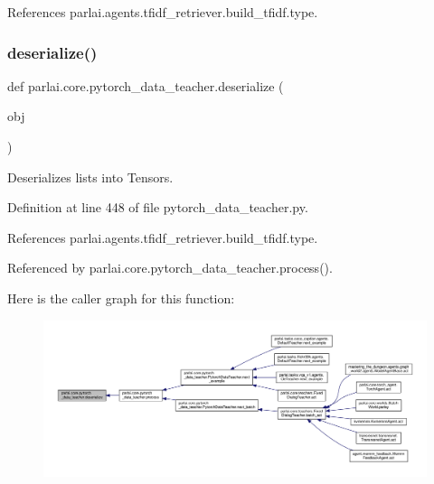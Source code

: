 References parlai.\+agents.\+tfidf\+\_\+retriever.\+build\+\_\+tfidf.\+type.

\mbox{\label{namespaceparlai_1_1core_1_1pytorch__data__teacher_a0c6f08553514c14d037da194f9d112ae}} 
\subsubsection{\texorpdfstring{deserialize()}{deserialize()}}
{\footnotesize\ttfamily def parlai.\+core.\+pytorch\+\_\+data\+\_\+teacher.\+deserialize (\begin{DoxyParamCaption}\item[{}]{obj }\end{DoxyParamCaption})}

\begin{DoxyVerb}Deserializes lists into Tensors.\end{DoxyVerb}
 

Definition at line 448 of file pytorch\+\_\+data\+\_\+teacher.\+py.



References parlai.\+agents.\+tfidf\+\_\+retriever.\+build\+\_\+tfidf.\+type.



Referenced by parlai.\+core.\+pytorch\+\_\+data\+\_\+teacher.\+process().

Here is the caller graph for this function\+:
\nopagebreak
\begin{figure}[H]
\begin{center}
\leavevmode
\includegraphics[width=350pt]{namespaceparlai_1_1core_1_1pytorch__data__teacher_a0c6f08553514c14d037da194f9d112ae_icgraph}
\end{center}
\end{figure}
\mbox{\label{namespaceparlai_1_1core_1_1pytorch__data__teacher_afbd22acd239efcdb6afb94db83ee3493}} 
